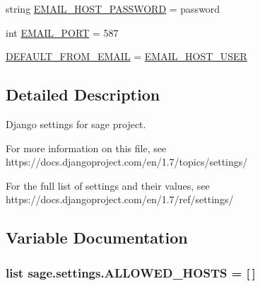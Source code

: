 \begin{DoxyCompactItemize}
\item 
string \hyperlink{namespacesage_1_1settings_a66e7a16ed6b0df5716a6579fcba949a6}{E\+M\+A\+I\+L\+\_\+\+H\+O\+S\+T\+\_\+\+P\+A\+S\+S\+W\+O\+R\+D} = \textquotesingle{}password\textquotesingle{}
\item 
int \hyperlink{namespacesage_1_1settings_a3fe927460bba6408b5df39fa8a10d367}{E\+M\+A\+I\+L\+\_\+\+P\+O\+R\+T} = 587
\item 
\hyperlink{namespacesage_1_1settings_a6517c4f93850d63e2bdbe7040ad0e2ff}{D\+E\+F\+A\+U\+L\+T\+\_\+\+F\+R\+O\+M\+\_\+\+E\+M\+A\+I\+L} = \hyperlink{namespacesage_1_1settings_a9c01855359753a3c3f517341806347c2}{E\+M\+A\+I\+L\+\_\+\+H\+O\+S\+T\+\_\+\+U\+S\+E\+R}
\end{DoxyCompactItemize}


\subsection{Detailed Description}
\begin{DoxyVerb}Django settings for sage project.

For more information on this file, see
https://docs.djangoproject.com/en/1.7/topics/settings/

For the full list of settings and their values, see
https://docs.djangoproject.com/en/1.7/ref/settings/
\end{DoxyVerb}
 

\subsection{Variable Documentation}
\hypertarget{namespacesage_1_1settings_a2eb98def792cf73bbc5884024afc5602}{}
\subsubsection[{A\+L\+L\+O\+W\+E\+D\+\_\+\+H\+O\+S\+T\+S}]{\setlength{\rightskip}{0pt plus 5cm}list sage.\+settings.\+A\+L\+L\+O\+W\+E\+D\+\_\+\+H\+O\+S\+T\+S = \mbox{[}$\,$\mbox{]}}\label{namespacesage_1_1settings_a2eb98def792cf73bbc5884024afc5602}
\hypertarget{namespacesage_1_1settings_add6d83672b1137d74a06bf1606aecf04}{}
